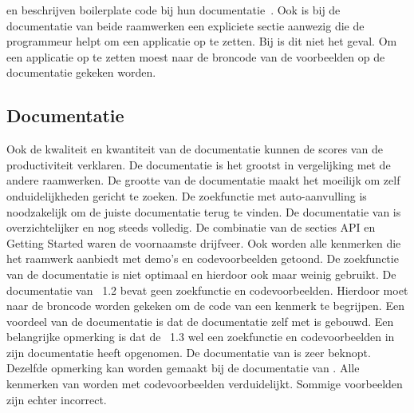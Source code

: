 \jqm{} en \kendo{} beschrijven boilerplate code bij hun documentatie~\cite{JQuery2012b,Telerikd}.
Ook is bij de documentatie van beide raamwerken een expliciete sectie aanwezig die de programmeur helpt om een applicatie op te zetten.
Bij \lungo{} is dit niet het geval.  
Om een \lungo{} applicatie op te zetten moest naar de broncode van de voorbeelden op de documentatie gekeken worden.

\subsection{Documentatie}
Ook de kwaliteit en kwantiteit van de documentatie kunnen de scores van de productiviteit verklaren.
De \st{} documentatie is het grootst in vergelijking met de andere raamwerken.
De grootte van de documentatie maakt het moeilijk om zelf onduidelijkheden gericht te zoeken.
De zoekfunctie met auto-aanvulling is noodzakelijk om de juiste documentatie terug te vinden.
De documentatie van \kendo{} is overzichtelijker en nog steeds volledig.
De combinatie van de secties API en Getting Started waren de voornaamste drijfveer.
Ook worden alle kenmerken die het raamwerk aanbiedt met demo's en codevoorbeelden getoond.
De zoekfunctie van de documentatie is niet optimaal en hierdoor ook maar weinig gebruikt.
De documentatie van \jqm{}~1.2 bevat geen zoekfunctie en codevoorbeelden.
Hierdoor moet naar de broncode worden gekeken om de code van een kenmerk te begrijpen.
Een voordeel van de \jqm{} documentatie is dat de documentatie zelf met \jqm{} is gebouwd.
Een belangrijke opmerking is dat de \jqm{}~1.3 wel een zoekfunctie en codevoorbeelden in zijn documentatie heeft opgenomen.
De documentatie van \lungo{} is zeer beknopt.
Dezelfde opmerking kan worden gemaakt bij de documentatie van \quo.
Alle kenmerken van \lungo{} worden met codevoorbeelden verduidelijkt.
Sommige voorbeelden zijn echter incorrect.

